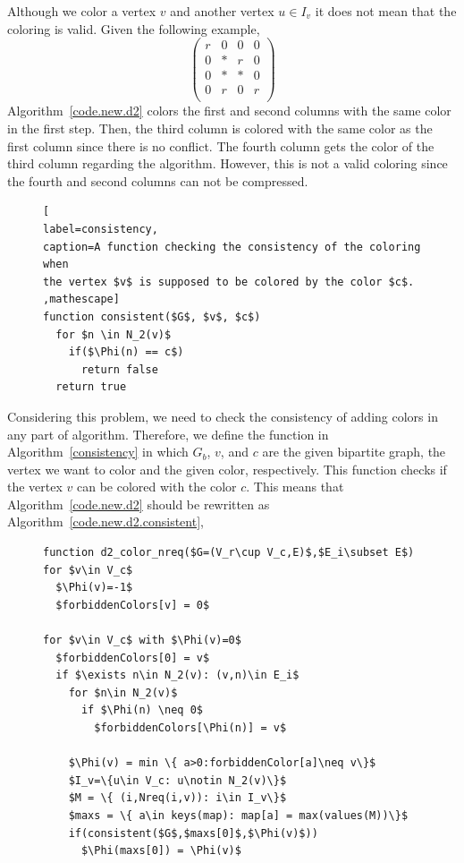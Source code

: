 \documentclass[11pt, twoside,a4paper]{book}
\newcommand{\coderef}[1]{Algorithm~\protect\ref{#1}}
\begin{document}
Although we color a vertex $v$ and another vertex $u\in I_v$
it does not mean that the coloring is valid.
Given the following example,
\begin{equation}
\left(\begin{array}{cccc}
r & 0 & 0 & 0  \\
0 & * & r & 0 \\
0 & * & * & 0 \\
0 & r & 0 & r \\
\end{array}\right)
\label{twocolorings2}
\end{equation}
\coderef{code.new.d2} colors the first and second columns with the same color
in the first step. Then, the third column is colored with the same color as the
first column since there is no conflict. The fourth column gets the color of
the third column regarding the algorithm. However, this is not a valid coloring
since the fourth and second columns can not be compressed.
\begin{figure}
\begin{lstlisting}[
label=consistency,
caption=A function checking the consistency of the coloring when
the vertex $v$ is supposed to be colored by the color $c$.
,mathescape]
function consistent($G$, $v$, $c$)
  for $n \in N_2(v)$
    if($\Phi(n) == c$)
      return false
  return true
\end{lstlisting}
\end{figure}

Considering this problem, we need to check the consistency of adding colors in
any part of algorithm. Therefore, we define the function in \coderef{consistency} in which
$G_b$, $v$, and $c$ are the given bipartite graph, the vertex we want to color
and the given color, respectively.
This function checks if the vertex $v$ can be colored with the color $c$.
This means that \coderef{code.new.d2} should be rewritten as \coderef{code.new.d2.consistent},
\begin{figure}
\begin{lstlisting}[caption=New coloring heuristic for distance-$2$ coloring
considering the nonrequired elements and checking the consistency.,
label=code.new.d2.consistent,mathescape]
function d2_color_nreq($G=(V_r\cup V_c,E)$,$E_i\subset E$)
for $v\in V_c$
  $\Phi(v)=-1$
  $forbiddenColors[v] = 0$

for $v\in V_c$ with $\Phi(v)=0$
  $forbiddenColors[0] = v$
  if $\exists n\in N_2(v): (v,n)\in E_i$
    for $n\in N_2(v)$
      if $\Phi(n) \neq 0$
        $forbiddenColors[\Phi(n)] = v$

    $\Phi(v) = min \{ a>0:forbiddenColor[a]\neq v\}$
    $I_v=\{u\in V_c: u\notin N_2(v)\}$
    $M = \{ (i,Nreq(i,v)): i\in I_v\}$
    $maxs = \{ a\in keys(map): map[a] = max(values(M))\}$
    if(consistent($G$,$maxs[0]$,$\Phi(v)$))
      $\Phi(maxs[0]) = \Phi(v)$
\end{lstlisting}
\end{figure}
\end{document}

